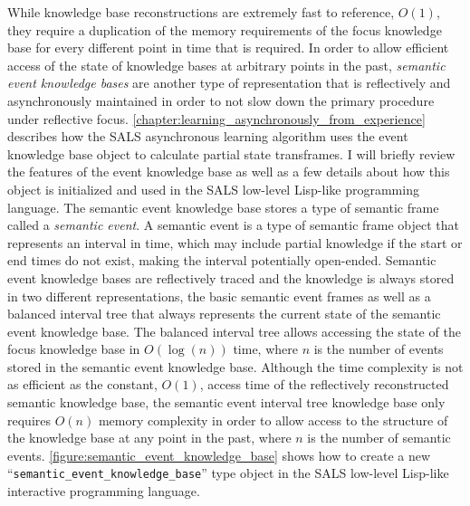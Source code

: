 While knowledge base reconstructions are extremely fast to reference,
$O(1)$, they require a duplication of the memory requirements of the
focus knowledge base for every different point in time that is
required.  In order to allow efficient access of the state of
knowledge bases at arbitrary points in the past, {\emph{semantic event
    knowledge bases}} are another type of representation that is
reflectively and asynchronously maintained in order to not slow down
the primary procedure under reflective focus.
{\mbox{\autoref{chapter:learning_asynchronously_from_experience}}}
describes how the SALS asynchronous learning algorithm uses the event
knowledge base object to calculate partial state transframes.  I will
briefly review the features of the event knowledge base as well as a
few details about how this object is initialized and used in the SALS
low-level Lisp-like programming language.  The semantic event
knowledge base stores a type of semantic frame called a
{\emph{semantic event}}.  A semantic event is a type of semantic frame
object that represents an interval in time, which may include partial
knowledge if the start or end times do not exist, making the interval
potentially open-ended.  Semantic event knowledge bases are
reflectively traced and the knowledge is always stored in two
different representations, the basic semantic event frames as well as
a balanced interval tree that always represents the current state of
the semantic event knowledge base.  The balanced interval tree allows
accessing the state of the focus knowledge base in $O(\log{(n)})$
time, where $n$ is the number of events stored in the semantic event
knowledge base.  Although the time complexity is not as efficient as
the constant, $O(1)$, access time of the reflectively reconstructed
semantic knowledge base, the semantic event interval tree knowledge
base only requires $O(n)$ memory complexity in order to allow access
to the structure of the knowledge base at any point in the past, where
$n$ is the number of semantic events.
{\mbox{\autoref{figure:semantic_event_knowledge_base}}} shows how to
create a new ``{\tt{semantic\_event\_knowledge\_base}}'' type object
in the SALS low-level Lisp-like interactive programming language.
